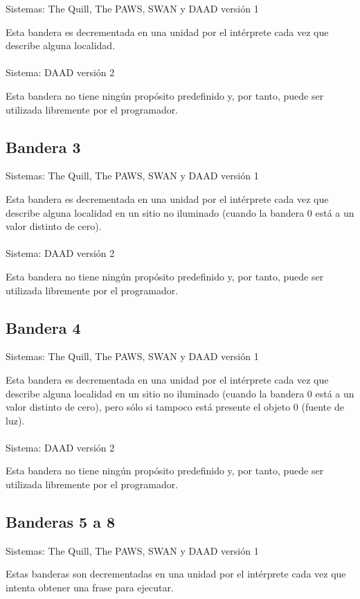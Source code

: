 \documentclass[11pt, a5paper]{article}
\newcommand{\quill}{\textsf{The Quill}\xspace}
\newcommand{\paw}{\textsf{The PAWS}\xspace}
\newcommand{\swan}{\textsf{SWAN}\xspace}
\newcommand{\daad}{\textsf{DAAD}\xspace}
\newcommand{\sistema}[1]{\noindent Sistema: #1 \nopagebreak}
\newcommand{\sistemas}[1]{\noindent Sistemas: #1 \nopagebreak}
\begin{document}
\sistemas{\quill, \paw, \swan y \daad versión 1}

Esta bandera es decrementada en una unidad por el intérprete cada vez que describe alguna localidad.
\\\ \\
\sistema{\daad versión 2}

Esta bandera no tiene ningún propósito predefinido y, por tanto, puede ser utilizada libremente por el programador.

\subsection{Bandera 3}

\sistemas{\quill, \paw, \swan y \daad versión 1}

Esta bandera es decrementada en una unidad por el intérprete cada vez que describe alguna localidad en un sitio no iluminado (cuando la bandera 0 está a un valor distinto de cero).
\\\ \\
\sistema{\daad versión 2}

Esta bandera no tiene ningún propósito predefinido y, por tanto, puede ser utilizada libremente por el programador.

\subsection{Bandera 4}

\sistemas{\quill, \paw, \swan y \daad versión 1}

Esta bandera es decrementada en una unidad por el intérprete cada vez que describe alguna localidad en un sitio no iluminado (cuando la bandera 0 está a un valor distinto de cero), pero sólo si tampoco está presente el objeto 0 (fuente de luz).
\\\ \\
\sistema{\daad versión 2}

Esta bandera no tiene ningún propósito predefinido y, por tanto, puede ser utilizada libremente por el programador.

\subsection{Banderas 5 a 8}

\sistemas{\quill, \paw, \swan y \daad versión 1}

Estas banderas son decrementadas en una unidad por el intérprete cada vez que intenta obtener una frase para ejecutar.
\end{document}
